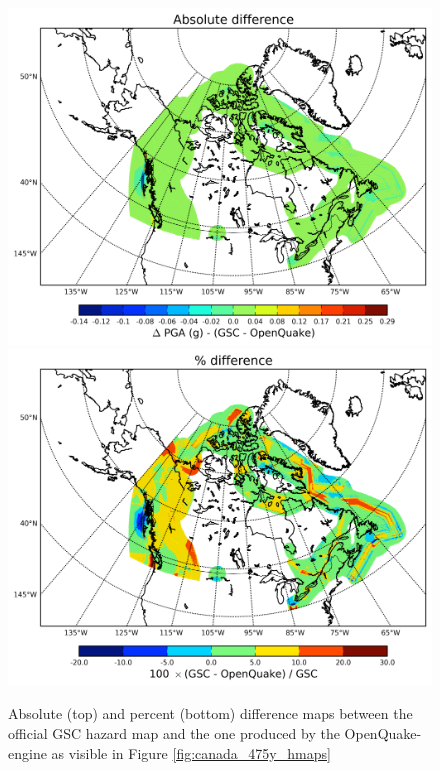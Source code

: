 \begin{figure}
\centering
\includegraphics[width=14cm]{./qareport/pictures/GSC_OQ_PGA_0pt1_abs_diff.pdf}
\includegraphics[width=14cm]{./qareport/pictures/GSC_OQ_PGA_0pt1_percent_diff.pdf}
\caption{Absolute (top) and percent (bottom) difference maps between the official GSC hazard map and the one produced by the OpenQuake-engine as visible in Figure \ref{fig:canada_475y_hmaps}}
\label{fig:canada_475y_dmaps}
\end{figure}
